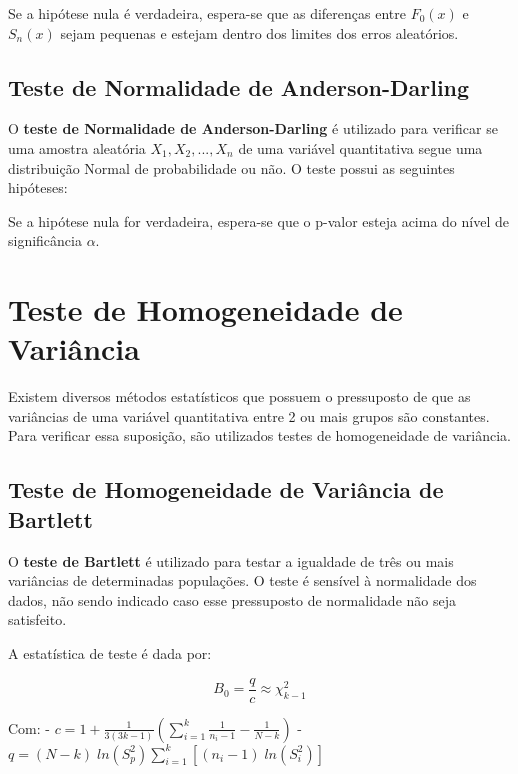 \documentclass[
]{estat/estat}
\begin{document}
Se a hipótese nula é verdadeira, espera-se que as diferenças entre
\(F_0(x)\) e \(S_n(x)\) sejam pequenas e estejam dentro dos limites dos
erros aleatórios.

\subsection{Teste de Normalidade de
Anderson-Darling}\label{teste-de-normalidade-de-anderson-darling}

O \textbf{teste de Normalidade de Anderson-Darling} é utilizado para
verificar se uma amostra aleatória \(X_1, X_2, ..., X_n\) de uma
variável quantitativa segue uma distribuição Normal de probabilidade ou
não. O teste possui as seguintes hipóteses:

\begin{center}
\end{center}

Se a hipótese nula for verdadeira, espera-se que o p-valor esteja acima
do nível de significância \(\alpha\).

\section{Teste de Homogeneidade de
Variância}\label{teste-de-homogeneidade-de-variuxe2ncia}

Existem diversos métodos estatísticos que possuem o pressuposto de que
as variâncias de uma variável quantitativa entre 2 ou mais grupos são
constantes. Para verificar essa suposição, são utilizados testes de
homogeneidade de variância.

\subsection{Teste de Homogeneidade de Variância de
Bartlett}\label{teste-de-homogeneidade-de-variuxe2ncia-de-bartlett}

O \textbf{teste de Bartlett} é utilizado para testar a igualdade de três
ou mais variâncias de determinadas populações. O teste é sensível à
normalidade dos dados, não sendo indicado caso esse pressuposto de
normalidade não seja satisfeito.

A estatística de teste é dada por:

\[ B_0 = \frac{q}{c} \approx \chi^2_{k-1} \]

Com: -
\(\displaystyle c = 1 + \frac{1}{3(3k-1)}\left(\sum_{i=1}^{k} \frac{1}{n_i - 1} - \frac{1}{N - k}\right)\)
-
\(\displaystyle q = (N - k) \; ln \left( S^2_p \right) \sum_{i=1}^{k} \left[(n_i - 1) \; ln \left( S^2_i \right) \right]\)
\end{document}
